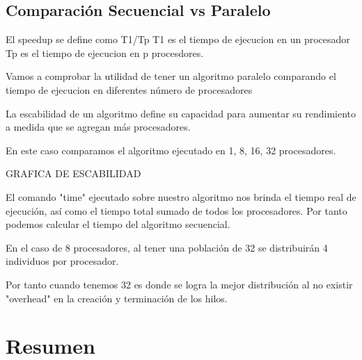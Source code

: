 \subsection{Comparación Secuencial vs  Paralelo}

El speedup se define como T1/Tp
T1 es el tiempo de ejecucion en un procesador
Tp es el tiempo de ejecucion en p procesdores.


Vamos a comprobar la utilidad de tener un algoritmo paralelo comparando el tiempo de ejecucion en diferentes número de procesadores

La escabilidad de un algoritmo define su capacidad para aumentar su rendimiento a medida que se agregan más procesadores.

En este caso comparamos el algoritmo ejecutado en 1, 8, 16, 32 procesadores.

GRAFICA DE ESCABILIDAD

El comando "time" ejecutado sobre nuestro algoritmo nos brinda el tiempo real de ejecución, así como el tiempo total sumado de todos los procesadores. Por tanto podemos calcular el tiempo del algoritmo secuencial.

En el caso de 8 procesadores, al tener una población de 32 se distribuirán 4 individuos por procesador.

Por tanto cuando tenemos 32 es donde se logra la mejor distribución al no existir "overhead" en la creación y terminación de los hilos.


\section{Resumen}

